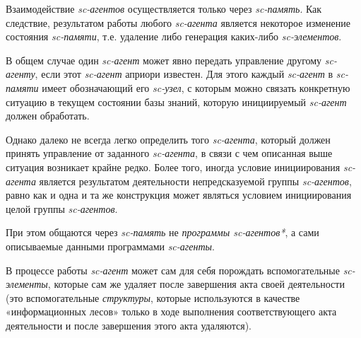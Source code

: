 \begin{SCn}
{Взаимодействие \textit{sc-агентов} осуществляется только через \textit{sc-память}. Как следствие, результатом работы любого \textit{sc-агента} является некоторое изменение состояния \textit{sc-памяти}, т.е. удаление либо генерация каких-либо \textit{sc-элементов}.

В общем случае один \textit{sc-агент} может явно передать управление другому \textit{sc-агенту}, если этот \textit{sc-агент} априори известен. Для этого каждый \textit{sc-агент} в \textit{sc-памяти} имеет обозначающий его \textit{sc-узел}, с которым можно связать конкретную ситуацию в текущем состоянии базы знаний, которую инициируемый \textit{sc-агент} должен обработать.

Однако далеко не всегда легко определить того \textit{sc-агента}, который должен принять управление от заданного \textit{sc-агента}, в связи с чем описанная выше ситуация возникает крайне редко. Более того, иногда условие инициирования \textit{sc-агента} является результатом деятельности непредсказуемой группы \textit{sc-агентов}, равно как и одна и та же конструкция может являться условием инициирования целой группы \textit{sc-агентов}.

При этом общаются через \textit{sc-память} не \textit{программы sc-агентов*}, а сами описываемые данными программами \textit{sc-агенты}.

В процессе работы \textit{sc-агент} может сам для себя порождать вспомогательные \textit{sc-элементы}, которые сам же удаляет после завершения акта своей деятельности (это вспомогательные \textit{структуры}, которые используются в качестве «информационных лесов» только в ходе выполнения соответствующего акта деятельности и после завершения этого акта удаляются).}




\end{SCn}
